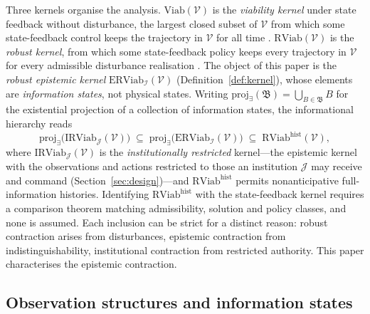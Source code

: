 \documentclass[11pt,a4paper]{article}
\theoremstyle{plain}
\theoremstyle{definition}
\theoremstyle{remark}
\newcommand{\Viab}{\mathrm{Viab}}
\newcommand{\RViab}{\mathrm{RViab}}
\newcommand{\ERViab}{\mathrm{ERViab}}
\newcommand{\IRViab}{\mathrm{IRViab}}
\newcommand{\cV}{\mathcal{V}}
\newcommand{\cI}{\mathcal{I}}
\newcommand{\cJ}{\mathcal{J}}
\begin{document}
Three kernels organise the analysis. $\Viab(\cV)$ is the \emph{viability kernel} under state feedback without disturbance, the largest closed subset of $\cV$ from which some state-feedback control keeps the trajectory in $\cV$ for all time \citep{aubin1991}. $\RViab(\cV)$ is the \emph{robust kernel}, from which some state-feedback policy keeps every trajectory in $\cV$ for every admissible disturbance realisation \citep{aubinfrankowska1990}. The object of this paper is the \emph{robust epistemic kernel} $\ERViab_\cI(\cV)$ (Definition~\ref{def:kernel}), whose elements are \emph{information states}, not physical states. Writing $\mathrm{proj}_\exists(\mathfrak B)=\bigcup_{B\in\mathfrak B}B$ for the existential projection of a collection of information states, the informational hierarchy reads
\begin{equation}\label{eq:hierarchy}
\mathrm{proj}_\exists\bigl(\IRViab_\cJ(\cV)\bigr)\;\subseteq\;\mathrm{proj}_\exists\bigl(\ERViab_\cI(\cV)\bigr)\;\subseteq\;\RViab^{\mathrm{hist}}(\cV),
\end{equation}
where $\IRViab_\cJ(\cV)$ is the \emph{institutionally restricted} kernel---the epistemic kernel with the observations and actions restricted to those an institution $\cJ$ may receive and command (Section~\ref{sec:design})---and $\RViab^{\mathrm{hist}}$ permits nonanticipative full-information histories. Identifying $\RViab^{\mathrm{hist}}$ with the state-feedback kernel requires a comparison theorem matching admissibility, solution and policy classes, and none is assumed. Each inclusion can be strict for a distinct reason: robust contraction arises from disturbances, epistemic contraction from indistinguishability, institutional contraction from restricted authority. This paper characterises the epistemic contraction.

\subsection{Observation structures and information states}\label{sec:information}
\end{document}
